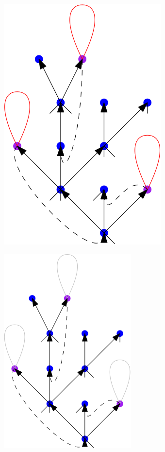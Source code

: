 \begin{figure}
\centering
\begin{subfigure}{.5\textwidth}
  \centering
    \includegraphics[width=.7\linewidth]{Content/Pictures/Blue-purple-red tree.png}
\end{subfigure}%
\begin{subfigure}{.5\textwidth}
  \centering
  \includegraphics[width=.7\linewidth]{Content/Pictures/Blue purple tree.png}

\end{subfigure}
\end{figure}
